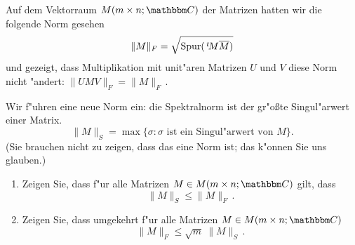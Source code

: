 \documentclass[a4,11pt]{article}
\begin{document}
\newpage

\begin{aufgabe}
Auf dem Vektorraum $M(m \times n; \C)$ der Matrizen hatten wir die
folgende Norm gesehen
\[
\| M \|_F = \sqrt{\text{Spur}(\,^t\!M \overline{M})}
\]
und gezeigt, dass Multiplikation mit unit"aren Matrizen $U$
und $V$
diese Norm nicht "andert:
$\| UMV \|_F = \| M \|_F$\,.

Wir f"uhren eine neue Norm ein: die Spektralnorm ist der gr"oßte
Singul"arwert einer Matrix.
\[
\| M \|_S = \max \{ \sigma : \sigma \text{ ist ein Singul"arwert von } M \}.
\]
(Sie brauchen nicht zu zeigen, dass das eine Norm ist; das k"onnen Sie
uns glauben.)
\begin{enumerate}
\item
Zeigen Sie, dass f"ur alle Matrizen $M \in M(m \times n; \C)$ gilt,
dass
\[
\| M \|_S \leq \| M \|_F \,.
\]
\item
  Zeigen Sie, dass umgekehrt f"ur alle Matrizen $M \in M(m \times n;
  \C)$
\[
\| M \|_F \leq \sqrt{m} \ \| M \|_S \,.
\]
\end{enumerate}

\end{aufgabe}
\end{document}
